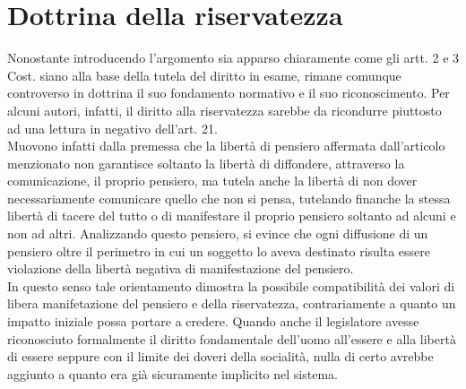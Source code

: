 \section{Dottrina della riservatezza}
Nonostante introducendo l'argomento sia apparso chiaramente come gli artt. 2 e 3 Cost. siano alla base della tutela del diritto in esame, rimane comunque controverso in dottrina il suo fondamento normativo e il suo riconoscimento. 
Per alcuni autori, infatti, il diritto alla riservatezza sarebbe da ricondurre piuttosto ad una lettura in negativo dell'art. 21.
\\Muovono infatti dalla premessa che la libertà di pensiero affermata dall'articolo menzionato non garantisce soltanto la libertà di diffondere, attraverso la comunicazione, il proprio pensiero, ma tutela anche la libertà di non dover necessariamente comunicare quello che non si pensa, tutelando finanche la stessa libertà di tacere del tutto o di  manifestare il proprio pensiero soltanto ad alcuni e non ad altri. Analizzando questo pensiero, si evince che ogni diffusione di un pensiero oltre il perimetro in cui un soggetto lo aveva destinato risulta essere violazione della libertà negativa di manifestazione del pensiero.
\\In questo senso  tale orientamento dimostra la possibile compatibilità dei valori di libera manifetazione del pensiero e della riservatezza, contrariamente a quanto un impatto iniziale possa portare a credere.
Quando anche il legislatore avesse riconosciuto formalmente il diritto fondamentale dell'uomo all'essere e alla libertà di essere seppure con il limite dei doveri della socialità, nulla di certo avrebbe aggiunto a quanto era già sicuramente implicito nel sistema.


